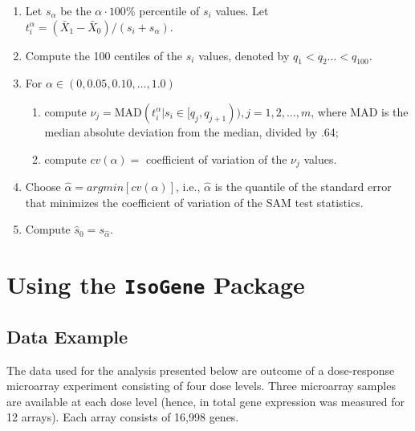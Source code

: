 \documentclass[10pt]{mybook4}
\begin{document}
\begin{enumerate}

\item Let $s_{\alpha}$ be the $\alpha \cdot 100\%$ percentile of $s_i$ values.
Let $t_i^{\alpha}= (\bar{X}_{1}-\bar{X}_{0})/(s_i+s_{\alpha})$.

\item Compute the 100 centiles of the $s_i$ values, denoted by $q_1 <
q_2\dots < q_{100}$.

\item For $\alpha \in (0, 0.05, 0.10, \dots, 1.0)$

\begin{enumerate}

\item compute $\nu_j= \mbox{MAD}(t_i^{\alpha}|s_i \in
[q_j,q_{j+1})),j=1,2,\dots,m$, where \mbox{MAD} is the median
absolute deviation from the median, divided by .64;

\item compute $cv(\alpha)=$ coefficient of variation of the $\nu_j$
values.

\end{enumerate}

\item Choose $\hat{\alpha}=argmin[cv(\alpha)]$, i.e.,
$\hat{\alpha}$ is the quantile of the standard error that minimizes
the coefficient of variation of the SAM test statistics.

\item Compute $\hat{s}_0=s_{\hat{\alpha}}$.

\end{enumerate}




\section{Using the \texttt{IsoGene} Package}

\subsection{Data Example}

The data used for the analysis presented below are outcome of a dose-response microarray experiment
consisting of four dose levels. Three microarray samples are available at each dose level (hence, in total
gene expression was measured for 12 arrays). Each array consists of 16,998 genes.
\end{document}
